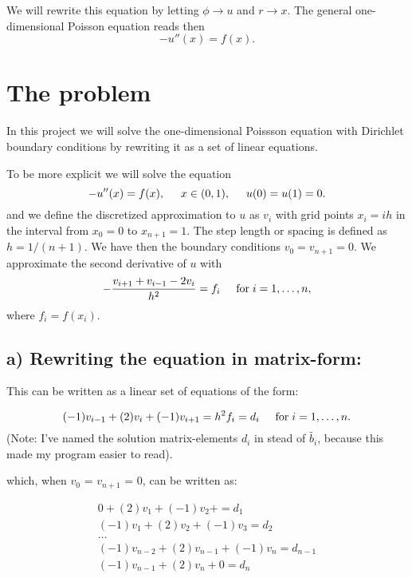 \documentclass[norsk,a4paper,12pt]{article}
\begin{document}
We will rewrite this equation by letting $\phi\rightarrow u$ and 
$r\rightarrow x$. 
The general one-dimensional Poisson equation reads then 
\[
-u''(x) = f(x).
\]




\section{The problem}
In this project we will solve the one-dimensional Poissson equation
with Dirichlet boundary conditions by rewriting it as a set of linear equations.

To be more explicit we will solve the equation
\[
-u''(x) = f(x), \hspace{0.5cm} x\in(0,1), \hspace{0.5cm} u(0) = u(1) = 0.
\]
and we define the discretized approximation  to $u$ as $v_i$  with 
grid points $x_i=ih$   in the interval from $x_0=0$ to $x_{n+1}=1$.
The step length or spacing is defined as $h=1/(n+1)$. 
We have then the boundary conditions $v_0 = v_{n+1} = 0$.
We  approximate the second
derivative of $u$ with 
\[
   -\frac{v_{i+1}+v_{i-1}-2v_i}{h^2} = f_i  \hspace{0.5cm} \mathrm{for} \hspace{0.1cm} i=1,\dots,n,
\]
where $f_i=f(x_i)$.

\subsection*{a) Rewriting the equation in matrix-form:}

This can be written as a linear set of equations of the form:

\[
(-1) v_{i-1} + (2) v_i + (-1) v_{i+1} = h^2f_i = d_i \hspace{0.5cm} \mathrm{for} \hspace{0.1cm} i=1,\dots,n.
\]
(Note: I've named the solution matrix-elements $d_i$ in stead of $\tilde{b_i}$, because this made my program easier to read).

which, when $v_0$ = $v_{n+1}$ = 0, can be written as:

\begin{equation}
\begin{split}
0 + (2) v_{1} + (-1) v_{2} + = d_1 \\
(-1) v_{1} + (2) v_{2} + (-1) v_{3} = d_2 \\
\dots \\
(-1) v_{n-2} + (2) v_{n-1} + (-1) v_{n} = d_{n-1} \\
(-1) v_{n-1} + (2) v_{n} + 0 = d_{n} \\
\end{split}
\end{equation}
	
\end{document}
